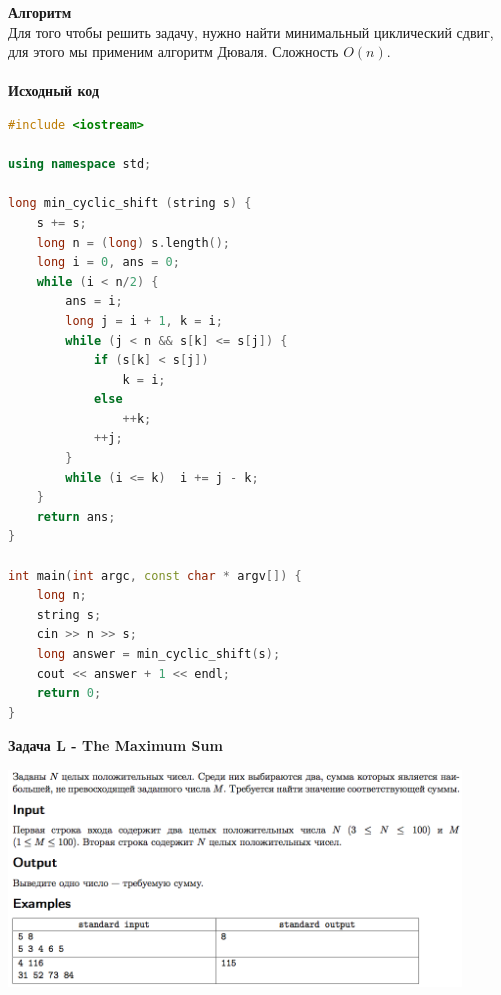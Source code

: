 \documentclass[a4paper,12pt]{article}
\begin{document}
\textbf{{\large Алгоритм}} \\
Для того чтобы решить задачу, нужно найти минимальный циклический сдвиг, для этого мы применим алгоритм Дюваля. Сложность $O(n)$. \\ 
\\
\textbf{{\large Исходный код}}
\begin{lstlisting}[language=C++]
#include <iostream>

using namespace std;

long min_cyclic_shift (string s) {
    s += s;
    long n = (long) s.length();
    long i = 0, ans = 0;
    while (i < n/2) {
        ans = i;
        long j = i + 1, k = i;
        while (j < n && s[k] <= s[j]) {
            if (s[k] < s[j])
                k = i;
            else
                ++k;
            ++j;
        }
        while (i <= k)  i += j - k;
    }
    return ans;
}

int main(int argc, const char * argv[]) {
    long n;
    string s;
    cin >> n >> s;
    long answer = min_cyclic_shift(s);
    cout << answer + 1 << endl;
    return 0;
}
\end{lstlisting}
\newpage
\textbf{{\large Задача L - The Maximum Sum}} \\
\begin{center}
\includegraphics[width=0.9\textwidth]{OC_Japan/OC_Japan_L.png}\\ [1cm]
\end{center}
\newpage
\end{document}
